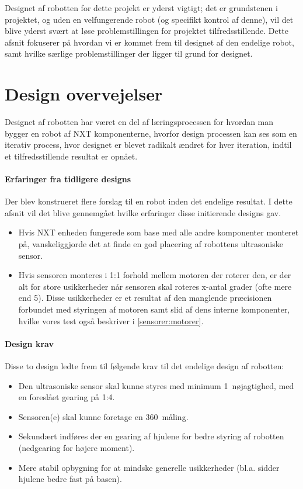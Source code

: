 Designet af robotten for dette projekt er yderst vigtigt; det er grundstenen i projektet, og uden en velfungerende robot (og specifikt kontrol af denne), vil det blive yderst svært at løse problemstillingen for projektet tilfredsstillende.
Dette afsnit fokuserer på hvordan vi er kommet frem til designet af den endelige robot, samt hvilke særlige problemstillinger der ligger til grund for designet.

\section{Design overvejelser}\label{robot:design}
Designet af robotten har været en del af læringsprocessen for hvordan man bygger en robot af \lego NXT komponenterne, hvorfor design processen kan ses som en iterativ process, hvor designet er blevet radikalt ændret for hver iteration, indtil et tilfredsstillende resultat er opnået.


\paragraph{Erfaringer fra tidligere designs} 
Der blev konstrueret flere forslag til en robot inden det endelige resultat. 
I dette afsnit vil det blive gennemgået hvilke erfaringer disse initierende designs gav.


\begin{itemize}
\item Hvis NXT enheden fungerede som base med alle andre komponenter monteret på, vanskeliggjorde det at finde en god placering af robottens ultrasoniske sensor.

\item Hvis sensoren monteres i 1:1 forhold mellem motoren der roterer den, er der alt for store usikkerheder når sensoren skal roteres x-antal grader (ofte mere end 5\degree).
Disse usikkerheder er et resultat af den manglende præcisionen forbundet med styringen af motoren samt slid af dens interne komponenter, hvilke vores test også beskriver i \cref{sensorer:motorer}.
\end{itemize}

\paragraph{Design krav}
Disse to design ledte frem til følgende krav til det endelige design af robotten:

\begin{itemize}
\item Den ultrasoniske sensor skal kunne styres med  minimum 1\degree~nøjagtighed, med en foreslået gearing på 1:4.
\item Sensoren(e) skal kunne foretage en 360\degree~måling.
\item Sekundært indføres der en gearing af hjulene for bedre styring af robotten (nedgearing for højere moment).
\item Mere stabil opbygning for at mindske generelle usikkerheder (bl.a. sidder hjulene bedre fast på basen).
\end{itemize} 


